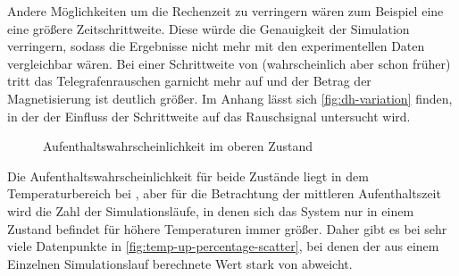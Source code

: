 \documentclass[main.tex]{subfiles}
\begin{document}
Andere Möglichkeiten um die Rechenzeit zu verringern wären zum Beispiel eine eine größere Zeitschrittweite. Diese würde die Genauigkeit der Simulation verringern, sodass die Ergebnisse nicht mehr mit den experimentellen Daten vergleichbar wären. Bei einer Schrittweite von  (wahrscheinlich aber schon früher) tritt das Telegrafenrauschen garnicht mehr auf und der Betrag der Magnetisierung ist deutlich größer. 
Im Anhang lässt sich \cref{fig:dh-variation} finden, in der der Einfluss der Schrittweite auf das Rauschsignal untersucht wird.


\begin{figure}[H]
    \centering
    \caption{Aufenthaltswahrscheinlichkeit im oberen Zustand}\label{fig:temp-up-percentage}
\end{figure}

Die Aufenthaltswahrscheinlichkeit für beide Zustände liegt in dem Temperaturbereich bei , aber für die Betrachtung der mittleren Aufenthaltszeit wird die Zahl der Simulationsläufe, in denen sich das System nur in einem Zustand befindet für höhere Temperaturen immer größer. Daher gibt es bei  sehr viele Datenpunkte in \cref{fig:temp-up-percentage-scatter}, bei denen der aus einem Einzelnen Simulationslauf berechnete Wert stark von  abweicht.
\end{document}

